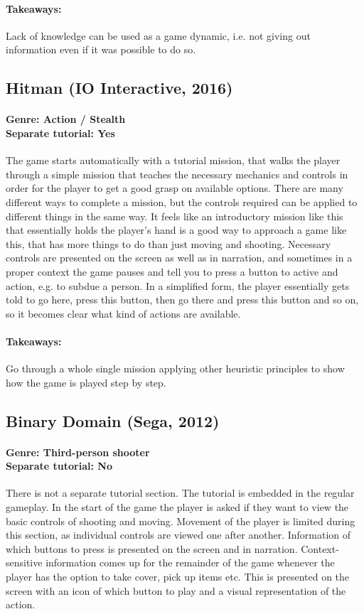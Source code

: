 \paragraph{Takeaways:}
Lack of knowledge can be used as a game dynamic, i.e. not giving out information even if it was possible to do so.

\subsection{Hitman (IO Interactive, 2016)}
\paragraph{Genre: Action / Stealth \\ Separate tutorial: Yes \\}
The game starts automatically with a tutorial mission, that walks the player through a simple mission that teaches the necessary mechanics and controls in order for the player to get a good grasp on available options. There are many different ways to complete a mission, but the controls required can be applied to different things in the same way. It feels like an introductory mission like this that essentially holds the player's hand is a good way to approach a game like this, that has more things to do than just moving and shooting. Necessary controls are presented on the screen as well as in narration, and sometimes in a proper context the game pauses and tell you to press a button to active and action, e.g. to subdue a person. In a simplified form, the player essentially gets told to go here, press this button, then go there and press this button and so on, so it becomes clear what kind of actions are available.
\paragraph{Takeaways:}
Go through a whole single mission applying other heuristic principles to show how the game is played step by step.

\subsection{Binary Domain (Sega, 2012)}
\paragraph{Genre: Third-person shooter \\ Separate tutorial: No \\} 
There is not a separate tutorial section. The tutorial is embedded in the regular gameplay. In the start of the game the player is asked if they want to view the basic controls of shooting and moving. Movement of the player is limited during this section, as individual controls are viewed one after another. Information of which buttons to press is presented on the screen and in narration. Context-sensitive information comes up for the remainder of the game whenever the player has the option to take cover, pick up items etc. This is presented on the screen with an icon of which button to play and a visual representation of the action.
